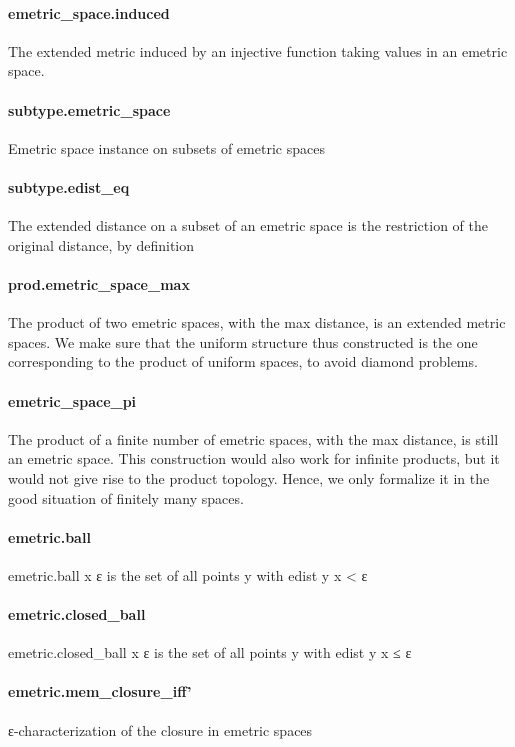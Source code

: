 \documentclass{article}
\begin{document}
\paragraph{emetric\_space.induced}
\par
The extended metric induced by an injective function taking values in an emetric space.
\paragraph{subtype.emetric\_space}
\par
Emetric space instance on subsets of emetric spaces
\paragraph{subtype.edist\_eq}
\par
The extended distance on a subset of an emetric space is the restriction of
the original distance, by definition
\paragraph{prod.emetric\_space\_max}
\par
The product of two emetric spaces, with the max distance, is an extended
metric spaces. We make sure that the uniform structure thus constructed is the one
corresponding to the product of uniform spaces, to avoid diamond problems.
\paragraph{emetric\_space\_pi}
\par
The product of a finite number of emetric spaces, with the max distance, is still
an emetric space.
This construction would also work for infinite products, but it would not give rise
to the product topology. Hence, we only formalize it in the good situation of finitely many
spaces.
\paragraph{emetric.ball}
\par
\colorbox[RGB]{253,246,227}{{{{\color[RGB]{101, 123, 131} emetric.ball x ε }}}} is the set of all points 
\colorbox[RGB]{253,246,227}{{{{\color[RGB]{101, 123, 131} y }}}} with 
\colorbox[RGB]{253,246,227}{{{{\color[RGB]{101, 123, 131} edist y x  }}}{{{\color[RGB]{181, 137, 0} < }}}{{{\color[RGB]{101, 123, 131}  ε }}}}\paragraph{emetric.closed\_ball}
\par
\colorbox[RGB]{253,246,227}{{{{\color[RGB]{101, 123, 131} emetric.closed\_ball x ε }}}} is the set of all points 
\colorbox[RGB]{253,246,227}{{{{\color[RGB]{101, 123, 131} y }}}} with 
\colorbox[RGB]{253,246,227}{{{{\color[RGB]{101, 123, 131} edist y x  }}}{{{\color[RGB]{181, 137, 0} ≤ }}}{{{\color[RGB]{101, 123, 131}  ε }}}}\paragraph{emetric.mem\_closure\_iff'}
\par
ε-characterization of the closure in emetric spaces
\end{document}
